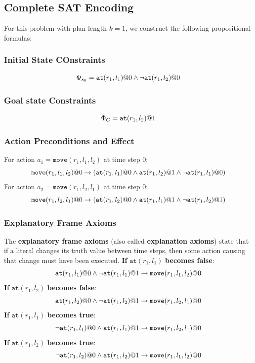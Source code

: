 \documentclass[a4paper]{article}
\theoremstyle{definition}
\begin{document}
\subsection{Complete SAT Encoding}
For this problem with plan length $k = 1$, we construct the following propositional formulas:
\subsubsection{Initial State COnstraints}
\[
  \Phi_{s_0} = \texttt{at}(r_1,l_1)\symbol{64}0 \wedge \lnot \texttt{at}(r_1,l_2)\symbol{64}0
\]
\subsubsection{Goal state Constraints}
\[
  \Phi_G = \texttt{at}(r_1,l_2)\symbol{64}1
\]
\subsubsection{Action Preconditions and Effect}
For action \( a_1 = \texttt{move}(r_1,l_1,l_2) \) at time step 0:
\[
  \texttt{move}(r_1,l_1,l_2)\symbol{64}0 \rightarrow (\texttt{at}(r_1,l_1)\symbol{64}0 \wedge \texttt{at}(r_1,l_2)\symbol{64}1 \wedge \lnot \texttt{at}(r_1,l_1)\symbol{64}0)
\]
For action \( a_2 = \texttt{move}(r_1,l_2,l_1) \) at time step 0:
\[
  \texttt{move}(r_1,l_2,l_1)\symbol{64}0 \rightarrow (\texttt{at}(r_1,l_2)\symbol{64}0 \wedge \texttt{at}(r_1,l_1)\symbol{64}1 \wedge \lnot \texttt{at}(r_1,l_2)\symbol{64}1)
\]
\subsubsection{Explanatory Frame Axioms}
The \textbf{explanatory frame axioms} (also called \textbf{explanation axioms}) state that if a literal changes its truth
value between time steps, then some action causing that change must have been executed.
\vspace{1em}
\noindent
\newline
\textbf{If} \( \texttt{at}(r_1,l_1) \) \textbf{becomes false}:
\[
  \texttt{at}(r_1,l_1)\symbol{64}0 \wedge \lnot \texttt{at}(r_1,l_1)\symbol{64}1 \rightarrow \texttt{move}(r_1,l_1,l_2)\symbol{64}0
\]
\textbf{If} \( \texttt{at}(r_1,l_2) \) \textbf{becomes false}:
\[
  \texttt{at}(r_1,l_2)\symbol{64}0 \wedge \lnot \texttt{at}(r_1,l_2)\symbol{64}1 \rightarrow \texttt{move}(r_1,l_2,l_1)\symbol{64}0
\]
\textbf{If} \( \texttt{at}(r_1,l_1) \) \textbf{becomes true}:
\[
  \lnot \texttt{at}(r_1,l_1)\symbol{64}0 \wedge \texttt{at}(r_1,l_1)\symbol{64}1 \rightarrow \texttt{move}(r_1,l_2,l_1)\symbol{64}0
\]
\textbf{If} \( \texttt{at}(r_1,l_2) \) \textbf{becomes true}:
\[
  \lnot \texttt{at}(r_1,l_2)\symbol{64}0 \wedge \texttt{at}(r_1,l_2)\symbol{64}1 \rightarrow \texttt{move}(r_1,l_1,l_2)\symbol{64}0
\]
\end{document}

